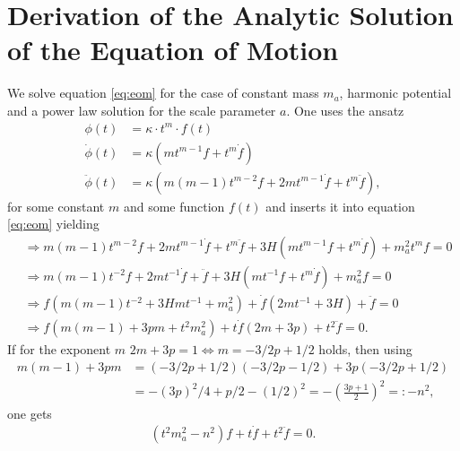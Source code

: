 \documentclass[twoside,a4paper, 12pt]{article}
\numberwithin{equation}{section}
\begin{document}
\section{Derivation of the Analytic Solution of the Equation of Motion}
\label{sec:derivation_of_the_analytic_result}
We solve equation \eqref{eq:eom} for the case of constant mass $m_a$, harmonic potential and a power law solution for the scale parameter $a$.
One uses the ansatz
\begin{align*}
    \phi(t) &= \kappa \cdot t^m \cdot f(t) \\
    \dot{\phi}(t) &= \kappa \left( m t^{m - 1} f + t^m \dot{f} \right) \\
    \ddot{\phi}(t) &= \kappa \left( m (m - 1) t^{m - 2} f + 2 m t^{m - 1} \dot{f} + t^m \ddot{f} \right),
\end{align*}
for some constant $m$ and some function $f(t)$ and inserts it into equation \eqref{eq:eom} yielding %
\begin{align*}
    &\Rightarrow m (m - 1) t^{m - 2} f + 2 m t^{m - 1} \dot{f} + t^m \ddot{f} + 3H \left( m t^{m - 1} f + t^m \dot{f} \right) + m_a^2 t^m f = 0 \\
    &\Rightarrow m (m - 1) t^{- 2} f + 2 m t^{- 1} \dot{f} + \ddot{f} + 3H \left( m t^{- 1} f + t^m \dot{f} \right) + m_a^2 f = 0 \\
    &\Rightarrow f \left( m (m - 1) t^{-2} + 3H m t^{-1} + m_a^2 \right) + \dot{f} \left( 2mt^{-1} + 3 H \right) + \ddot{f} = 0 \\
    &\Rightarrow
    f \left( m (m - 1) + 3pm + t^2 m_a^2 \right) + t \dot{f} \left( 2m + 3 p \right) + t^2 \ddot{f} = 0.
\end{align*}
If for the exponent $m$
$
    2m + 3p = 1 \iff m = - 3 / 2 p + 1 / 2
$
holds, then using
\begin{align}
    m (m - 1) + 3pm &= (-3/2p + 1/2) (-3/2p - 1/2) + 3p(-3/2p + 1/2) \\
                    &= - (3p)^2 / 4 + p/2 - (1/2)^2
                    = - \left(\frac{3p + 1}{2}\right)^2 =: -n^2,
\end{align}
one gets
\begin{align*}
    (t^2 m_a^2 - n^2) f + t \dot{f} + t^2 \ddot{f} = 0.
\end{align*}
\end{document}
